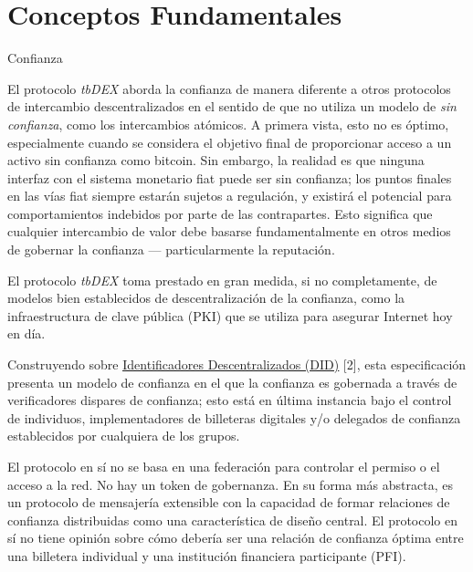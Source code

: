\documentclass[11pt]{article}
\begin{document}
\section{Conceptos Fundamentales}

\vspace{1\baselineskip}
{\LARGE Confianza}

\vspace{1\baselineskip}
El protocolo \textit{tbDEX} aborda la confianza de manera diferente a otros protocolos de intercambio descentralizados en el sentido de que no utiliza un modelo de \textit{sin confianza}, como los intercambios atómicos. A primera vista, esto no es óptimo, especialmente cuando se considera el objetivo final de proporcionar acceso a un activo sin confianza como bitcoin. Sin embargo, la realidad es que ninguna interfaz con el sistema monetario fiat puede ser sin confianza; los puntos finales en las vías fiat siempre estarán sujetos a regulación, y existirá el potencial para comportamientos indebidos por parte de las contrapartes. Esto significa que cualquier intercambio de valor debe basarse fundamentalmente en otros medios de gobernar la confianza \textcolor[HTML]{202124}{— }particularmente la reputación. 

\vspace{1\baselineskip}
El protocolo \textit{tbDEX} toma prestado en gran medida, si no completamente, de modelos bien establecidos de descentralización de la confianza, como la infraestructura de clave pública (PKI) que se utiliza para asegurar Internet hoy en día. 

\vspace{1\baselineskip}
Construyendo sobre \href{https://www.w3.org/TR/did-core}{\uline{\textcolor[HTML]{1155CC}{Identificadores Descentralizados (DID)}}} [2], esta especificación presenta un modelo de confianza en el que la confianza es gobernada a través de verificadores dispares de confianza; esto está en última instancia bajo el control de individuos, implementadores de billeteras digitales y/o delegados de confianza establecidos por cualquiera de los grupos. 

\vspace{1\baselineskip}
El protocolo en sí no se basa en una federación para controlar el permiso o el acceso a la red. No hay un token de gobernanza. En su forma más abstracta, es un protocolo de mensajería extensible con la capacidad de formar relaciones de confianza distribuidas como una característica de diseño central. El protocolo en sí no tiene opinión sobre cómo debería ser una relación de confianza óptima entre una billetera individual y una institución financiera participante (PFI). 
\end{document}
